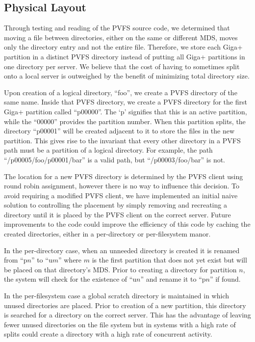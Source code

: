 \documentclass[letterpaper]{article}
\begin{document}
\subsection{Physical Layout}
Through testing and reading of the PVFS source code, we determined that moving
a file between directories, either on the same or different MDS, moves only
the directory entry and not the entire file.  Therefore, we store each Giga+
partition in a distinct PVFS directory instead of putting all Giga+ partitions
in one directory per server.  We believe that the cost of having to sometimes
split onto a local server is outweighed by the benefit of minimizing total
directory size.

Upon creation of a logical directory, ``foo'', we create a PVFS directory of
the same name.  Inside that PVFS directory, we create a PVFS directory for the
first Giga+ partition called ``p00000''.  The `p' signifies that this is an
active partition, while the ``00000'' provides the partition number.  When
this partition splits, the directory ``p00001'' will be created adjacent to it
to store the files in the new partition.  This gives rise to the invariant
that every other directory in a PVFS path must be a partition of a logical
directory.  For example, the path ``/p00005/foo/p00001/bar'' is a valid path,
but ``/p00003/foo/bar'' is not.

The location for a new PVFS directory is determined by the PVFS client using
round robin assignment, however there is no way to influence this
decision.  To avoid requiring a modified PVFS client, we have implemented an
initial naive solution to controlling the placement by simply removing and
recreating a directory until it is placed by the PVFS client on the correct
server.  Future improvements to the code could improve the efficiency of
this code by caching the created directories, either in a per-directory or
per-filesystem manor.  

In the per-directory case, when an unneeded directory is created it is renamed
from ``p$n$'' to ``u$m$'' where $m$ is the first partition that does not yet
exist but will be placed on that directory's MDS.  Prior to creating a
directory for partition $n$, the system will check for the existence of
``u$n$'' and rename it to ``p$n$'' if found.

In the per-filesystem case a global scratch directory is maintained in which
unused directories are placed.  Prior to creation of a new partition, this
directory is searched for a directory on the correct server.  This has the
advantage of leaving fewer unused directories on the file system but in systems
with a high rate of splits could create a directory with a high rate of
concurrent activity.
\end{document}
